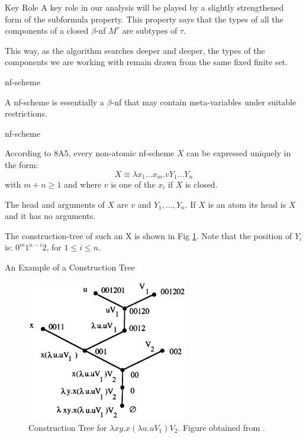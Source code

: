 \begin{frame}{Key Role}
    A key role in our analysis will be played by a slightly strengthened form of the subformula property. This property says that the types of all the components of a closed $\beta$-nf $M^\tau$ are subtypes of $\tau$. 
    
    \medskip 
    
    This way, as the algorithm searches deeper and deeper, the types of the components we are working with remain drawn from the same fixed finite set. 
\end{frame}



\begin{frame}{nf-scheme}
\begin{remark}
     A nf-scheme is essentially a $\beta$-nf that may contain meta-variables under suitable restrictions. 
\end{remark}
\end{frame}

\begin{frame}{nf-scheme}
\begin{remark}
According to 8A5, every non-atomic nf-scheme $X$ can be expressed uniquely in the form: 
\begin{equation*}
    X \equiv \lambda x_1 \ldots x_m.v Y_1 \ldots Y_n
\end{equation*}
with $m+n \geq 1$ and where $v$ is one of the $x_i$ if $X$ is closed. 

\medskip

The head and arguments of $X$ are $v$ and $Y_1, \ldots, Y_n$. If $X$ is an atom its head is $X$ and it has no arguments. 

\medskip 

The construction-tree of such an X is shown in Fig \ref{fig_construction}. Note that the position of $Y_i$ is: $0^{m} 1^{n-i} 2$, for $1 \le i \le n$. 
\end{remark}
\end{frame}

\begin{frame}{An Example of a Construction Tree}
\begin{figure}
    \centering
    \includegraphics[width=7cm]{fig4.png}
    \caption{Construction Tree for $\lambda xy.x(\lambda u.uV_1)V_2$.
    Figure obtained from \cite{hindley}.}
    \label{fig_construction}
\end{figure}
    
\end{frame}


